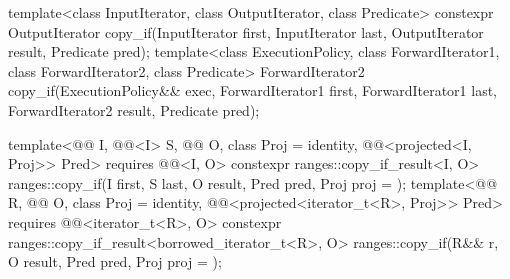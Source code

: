 %
\begin{itemdecl}
template<class InputIterator, class OutputIterator, class Predicate>
  constexpr OutputIterator copy_if(InputIterator first, InputIterator last,
                                   OutputIterator result, Predicate pred);
template<class ExecutionPolicy, class ForwardIterator1, class ForwardIterator2,
         class Predicate>
  ForwardIterator2 copy_if(ExecutionPolicy&& exec,
                           ForwardIterator1 first, ForwardIterator1 last,
                           ForwardIterator2 result, Predicate pred);

template<@@ I, @@<I> S, @@ O, class Proj = identity,
         @@<projected<I, Proj>> Pred>
  requires @@<I, O>
  constexpr ranges::copy_if_result<I, O>
    ranges::copy_if(I first, S last, O result, Pred pred, Proj proj = {});
template<@@ R, @@ O, class Proj = identity,
         @@<projected<iterator_t<R>, Proj>> Pred>
  requires @@<iterator_t<R>, O>
  constexpr ranges::copy_if_result<borrowed_iterator_t<R>, O>
    ranges::copy_if(R&& r, O result, Pred pred, Proj proj = {});
\end{itemdecl}


